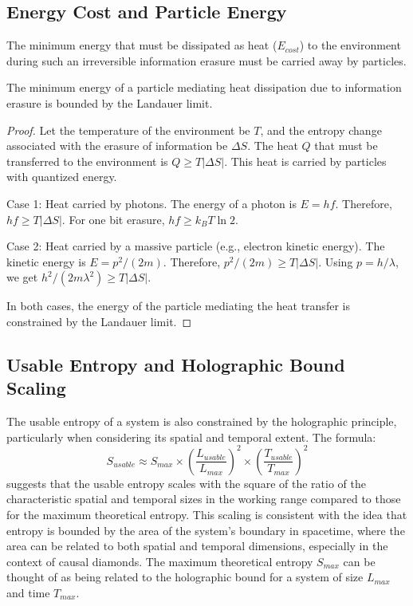 		\subsection{Energy Cost and Particle Energy}
		The minimum energy that must be dissipated as heat ($E_{cost}$) to the environment during such an irreversible information erasure must be carried away by particles.
		
		\begin{proposition}
			The minimum energy of a particle mediating heat dissipation due to information erasure is bounded by the Landauer limit.
		\end{proposition}
		\begin{proof}
			Let the temperature of the environment be $T$, and the entropy change associated with the erasure of information be $\Delta S$. The heat $Q$ that must be transferred to the environment is $Q \ge T |\Delta S|$. This heat is carried by particles with quantized energy.
			
			Case 1: Heat carried by photons. The energy of a photon is $E = h f$. Therefore, $h f \ge T |\Delta S|$. For one bit erasure, $h f \ge k_B T \ln 2$.
			
			Case 2: Heat carried by a massive particle (e.g., electron kinetic energy). The kinetic energy is $E = p^2 / (2m)$. Therefore, $p^2 / (2m) \ge T |\Delta S|$. Using $p = h / \lambda$, we get $h^2 / (2 m \lambda^2) \ge T |\Delta S|$.
			
			In both cases, the energy of the particle mediating the heat transfer is constrained by the Landauer limit.
		\end{proof}
		
		\subsection{Usable Entropy and Holographic Bound Scaling}
		The usable entropy of a system is also constrained by the holographic principle, particularly when considering its spatial and temporal extent. The formula:
		\begin{equation}
			S_{usable} \approx S_{max} \times \left( \frac{L_{usable}}{L_{max}} \right)^2 \times \left( \frac{T_{usable}}{T_{max}} \right)^2
		\end{equation}
		suggests that the usable entropy scales with the square of the ratio of the characteristic spatial and temporal sizes in the working range compared to those for the maximum theoretical entropy. This scaling is consistent with the idea that entropy is bounded by the area of the system's boundary in spacetime, where the area can be related to both spatial and temporal dimensions, especially in the context of causal diamonds. The maximum theoretical entropy $S_{max}$ can be thought of as being related to the holographic bound for a system of size $L_{max}$ and time $T_{max}$.
		
